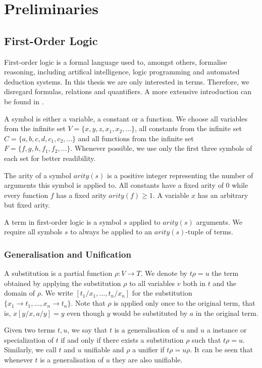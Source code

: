 \chapter{Preliminaries}
\section{First-Order Logic}
First-order logic is a formal language used to, amongst others, formalise reasoning, including artifical intelligence, logic programming and automated deduction systems. In this thesis we are only interested in terms. Therefore, we disregard formulas, relations and quantifiers. A more extensive introduction can be found in \cite{abiteboul_foundations_1995}.

A symbol is either a variable, a constant or a function. We choose all variables from the infinite set $V = \{x, y, z, x_{1}, x_{2}, ...\}$, all constants from the infinite set $C = \{a, b, c, d, c_{1}, c_{2}, ...\}$ and all functions from the infinite set $F = \{f, g, h, f_{1}, f_{2}, ...\}$. Whenever possible, we use only the first three symbols of each set for better readibility.

The arity of a symbol $arity(s)$ is a positive integer representing the number of arguments this symbol is applied to. All constants have a fixed arity of $0$ while every function $f$ has a fixed arity $arity(f) \geq 1$. A variable $x$ has an arbitrary but fixed arity.

A term in first-order logic is a symbol $s$ applied to $arity(s)$ arguments. We require all symbols $s$ to always be applied to an $arity(s)$-tuple of terms.

\subsection{Generalisation and Unification}
A substitution is a partial function $\rho : V \rightarrow T$. We denote by $t \rho = u$ the term obtained by applying the substitution $\rho$ to all variables $v$ both in $t$ and the domain of $\rho$. We write $[t_{1}/x_{1},...,t_{n}/x_{n}]$ for the substitution $\{x_{1} \rightarrow t_{1}, ..., x_{n} \rightarrow t_{n}\}$. Note that $\rho$ is applied only once to the original term, that is, $x [y/x, a/y] = y$ even though $y$ would be substituted by $a$ in the original term.

Given two terms $t, u$, we say that $t$ is a generalisation of $u$ and $u$ a instance or specialization of $t$ if and only if there exists a substitution $\rho$ such that $t \rho = u$. Similarly, we call $t$ and $u$ unifiable and $\rho$ a unifier if $t \rho = u \rho$. It can be seen that whenever $t$ is a generalisation of $u$ they are also unifiable.

